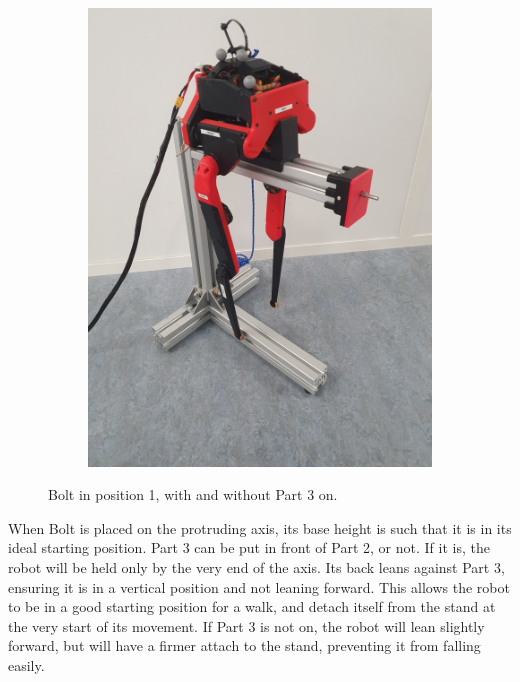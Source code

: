 \documentclass[a4paper,10pt]{article}
\begin{document}
\begin{figure}[H]
\begin{subfigure}{.5\textwidth}
  \includegraphics[width=1\linewidth, angle=0, scale=0.8]{./images/Bolt_stand_2.jpg}
\end{subfigure}
\caption{Bolt in position 1, with and without Part 3 on.}
\label{Bolt in position 1}
\end{figure}

When Bolt is placed on the protruding axis, its base height is such that it is in its ideal starting position. Part 3 can be put in front of Part 2, or not. If it is, the robot will be held only by the very end of the axis. Its back leans against Part 3, ensuring it is in a vertical position and not leaning forward. This allows the robot to be in a good starting position for a walk, and detach itself from the stand at the very start of its movement. If Part 3 is not on, the robot will lean slightly forward, but will have a firmer attach to the stand, preventing it from falling easily.\\

\vspace{5mm}
\end{document}
